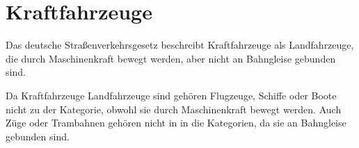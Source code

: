 \section{Kraftfahrzeuge}
Das deutsche Straßenverkehrsgesetz beschreibt Kraftfahrzeuge als Landfahrzeuge, die durch Maschinenkraft bewegt werden, aber nicht an Bahngleise gebunden sind.
\cite{str}

Da Kraftfahrzeuge Landfahrzeuge sind gehören Flugzeuge, Schiffe oder Boote nicht zu der Kategorie, obwohl sie durch Maschinenkraft bewegt werden.
Auch Züge oder Trambahnen gehören nicht in in die Kategorien, da sie an Bahngleise gebunden sind.








